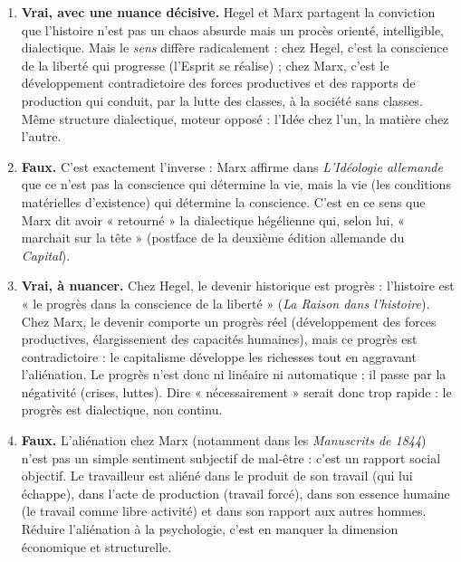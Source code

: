 \documentclass[11pt]{article}
\begin{document}
\begin{corrige}
\begin{enumerate}
\item \textbf{Vrai, avec une nuance décisive.} Hegel et Marx partagent la conviction que l'histoire n'est pas un chaos absurde mais un procès orienté, intelligible, dialectique. Mais le \emph{sens} diffère radicalement : chez Hegel, c'est la conscience de la liberté qui progresse (l'Esprit se réalise) ; chez Marx, c'est le développement contradictoire des forces productives et des rapports de production qui conduit, par la lutte des classes, à la société sans classes. Même structure dialectique, moteur opposé : l'Idée chez l'un, la matière chez l'autre.
\item \textbf{Faux.} C'est exactement l'inverse : Marx affirme dans \emph{L'Idéologie allemande} que ce n'est pas la conscience qui détermine la vie, mais la vie (les conditions matérielles d'existence) qui détermine la conscience. C'est en ce sens que Marx dit avoir « retourné » la dialectique hégélienne qui, selon lui, « marchait sur la tête » (postface de la deuxième édition allemande du \emph{Capital}).
\item \textbf{Vrai, à nuancer.} Chez Hegel, le devenir historique est progrès : l'histoire est « le progrès dans la conscience de la liberté » (\emph{La Raison dans l'histoire}). Chez Marx, le devenir comporte un progrès réel (développement des forces productives, élargissement des capacités humaines), mais ce progrès est contradictoire : le capitalisme développe les richesses tout en aggravant l'aliénation. Le progrès n'est donc ni linéaire ni automatique ; il passe par la négativité (crises, luttes). Dire « nécessairement » serait donc trop rapide : le progrès est dialectique, non continu.
\item \textbf{Faux.} L'aliénation chez Marx (notamment dans les \emph{Manuscrits de 1844}) n'est pas un simple sentiment subjectif de mal-être : c'est un rapport social objectif. Le travailleur est aliéné dans le produit de son travail (qui lui échappe), dans l'acte de production (travail forcé), dans son essence humaine (le travail comme libre activité) et dans son rapport aux autres hommes. Réduire l'aliénation à la psychologie, c'est en manquer la dimension économique et structurelle.
\end{enumerate}
\end{corrige}
\end{document}
